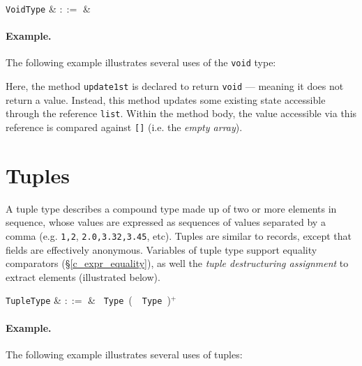\begin{syntax}
   \verb+VoidType+ & $::=$ &  \\
\end{syntax}

\paragraph{Example.} The following example illustrates several uses of the \lstinline{void} type:



Here, the method \lstinline{update1st} is declared to return \lstinline{void} --- meaning it does not return a value.  Instead, this method updates some existing state accessible through the reference \lstinline{list}.  Within the method body, the value accessible via this reference is compared against \lstinline{[]} (i.e. the {\em empty array}).


\section{Tuples}
\label{c_types_tuple}

A tuple type describes a compound type made up of two or more elements in sequence, whose values are expressed as sequences of values separated by a comma (e.g. \lstinline{1,2}, \lstinline{2.0,3.32,3.45}, etc).  Tuples are similar to records, except that fields are effectively anonymous.  Variables of tuple type support equality comparators (\S\ref{c_expr_equality}), as well the {\em tuple destructuring assignment} to extract elements (illustrated below).

\begin{syntax}
  \verb+TupleType+ & $::=$ & \token{(}\ \verb+Type+\ \big(\ \token{,}\
  \verb+Type+\ \big)$^+$\ \token{)}\\
\end{syntax}

\paragraph{Example.} The following example illustrates several uses of tuples:



